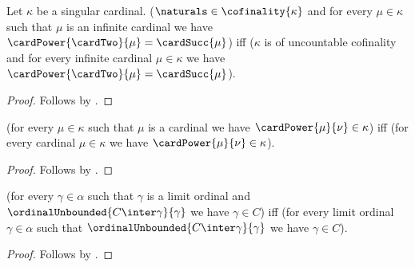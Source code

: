



\begin{proposition}\label{readability_silver_assumptions}
    Let $\kappa$ be a singular cardinal.
    ($\naturals\in\cofinality{\kappa}$ and
        for every $\mu\in\kappa$ such that $\mu$ is an infinite cardinal
        we have $\cardPower{\cardTwo}{\mu}=\cardSucc{\mu}$)
    iff
    ($\kappa$ is of uncountable cofinality and
        for every infinite cardinal $\mu\in\kappa$ we have
        $\cardPower{\cardTwo}{\mu}=\cardSucc{\mu}$).
\end{proposition}
\begin{proof}
    Follows by \auto.
\end{proof}

\begin{proposition}\label{readability_cardinal_bound}
    (for every $\mu\in\kappa$ such that $\mu$ is a cardinal we have
        $\cardPower{\mu}{\nu}\in\kappa$)
    iff
    (for every cardinal $\mu\in\kappa$ we have
        $\cardPower{\mu}{\nu}\in\kappa$).
\end{proposition}
\begin{proof}
    Follows by \auto.
\end{proof}

\begin{proposition}\label{readability_limit_ordinal_bound}
    (for every $\gamma\in\alpha$ such that $\gamma$ is a limit ordinal
        and $\ordinalUnbounded{C\inter\gamma}{\gamma}$ we have $\gamma\in C$)
    iff
    (for every limit ordinal $\gamma\in\alpha$ such that
        $\ordinalUnbounded{C\inter\gamma}{\gamma}$ we have $\gamma\in C$).
\end{proposition}
\begin{proof}
    Follows by \auto.
\end{proof}
